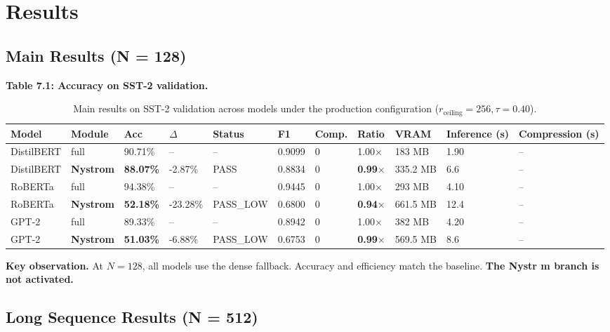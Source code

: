 
\section{Results}

\subsection{Main Results (N = 128)}

\textbf{Table 7.1: Accuracy on SST-2 validation.}

\begin{table}[t]
\centering
\small
\begin{tabular}{lllllllllll}
\toprule
\textbf{Model} & \textbf{Module} & \textbf{Acc} & \textbf{$\Delta$} & \textbf{Status} & \textbf{F1} & \textbf{Comp.} & \textbf{Ratio} & \textbf{VRAM} & \textbf{Inference (s)} & \textbf{Compression (s)} \\
\midrule
DistilBERT & full & 90.71\% & -- & -- & 0.9099 & 0 & 1.00$\times$ & 183 MB & 1.90 & -- \\
DistilBERT & \textbf{Nystrom} & \textbf{88.07\%} & -2.87\% & PASS & 0.8834 & 0 & \textbf{0.99$\times$} & 335.2 MB & 6.6 & -- \\
RoBERTa & full & 94.38\% & -- & -- & 0.9445 & 0 & 1.00$\times$ & 293 MB & 4.10 & -- \\
RoBERTa & \textbf{Nystrom} & \textbf{52.18\%} & -23.28\% & PASS_LOW & 0.6800 & 0 & \textbf{0.94$\times$} & 661.5 MB & 12.4 & -- \\
GPT-2 & full & 89.33\% & -- & -- & 0.8942 & 0 & 1.00$\times$ & 382 MB & 4.20 & -- \\
GPT-2 & \textbf{Nystrom} & \textbf{51.03\%} & -6.88\% & PASS_LOW & 0.6753 & 0 & \textbf{0.99$\times$} & 569.5 MB & 8.6 & -- \\
\bottomrule
\end{tabular}
\caption{Main results on SST-2 validation across models under the production configuration ($r_{\mathrm{ceiling}}=256, \tau=0.40$).}
\label{tab:main_sst2}
\end{table}

\textbf{Key observation.} At $N = 128$, all models use the dense fallback. Accuracy 
and efficiency match the baseline. \textbf{The Nystr m branch is not activated.}

\subsection{Long Sequence Results (N = 512)}

